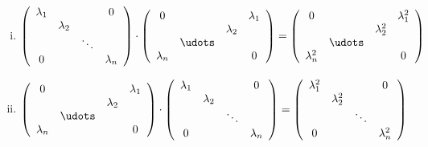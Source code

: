 \documentclass{article}
\begin{document}
\begin{enumerate}[(i)]
\item
  \[
    \left(
      \begin{array}{cccc}
        \lambda_1 &           &        & 0 \\
                  & \lambda_2 \\
                  &           & \ddots \\
        0         &           &        & \lambda_n \\
      \end{array}
    \right)
    \cdot
    \left(
      \begin{array}{cccc}
        0         &        &        & \lambda_1 \\
                  &        & \lambda_2 \\
                  & \udots \\
        \lambda_n &        &        & 0 \\
      \end{array}
    \right)
    =
    \left(
      \begin{array}{cccc}
        0           &         &             & \lambda_1^2 \\
                    &         & \lambda_2^2 &   \\
                    & \udots  &             &   \\
        \lambda_n^2 &         &             & 0 \\
      \end{array}
    \right)
  \]

\item
  \[
    \left(
      \begin{array}{cccc}
        0         &        &        & \lambda_1 \\
                  &        & \lambda_2 \\
                  & \udots \\
        \lambda_n &        &        & 0 \\
      \end{array}
    \right)
    \cdot
    \left(
      \begin{array}{cccc}
        \lambda_1 &           &        & 0 \\
                  & \lambda_2 \\
                  &           & \ddots \\
        0         &           &        & \lambda_n \\
      \end{array}
    \right)
    =
    \left(
      \begin{array}{cccc}
        \lambda_1^2 &             &        & 0 \\
                    & \lambda_2^2 &        &   \\
                    &             & \ddots &   \\
        0           &             &        & \lambda_n^2 \\
      \end{array}
    \right)
  \]


\end{enumerate}
\end{document}
